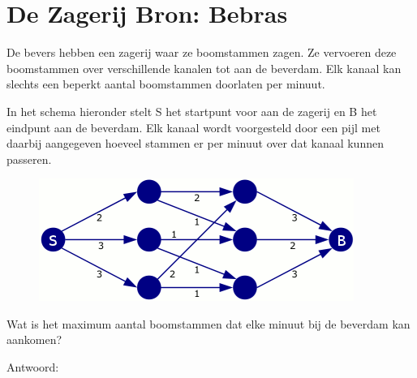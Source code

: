 \documentclass[12pt, a4paper]{article}
\begin{document}
	\begin{minipage}{\textwidth}
		\section{De Zagerij \hfill\small Bron: Bebras}
			De bevers hebben een zagerij waar ze boomstammen zagen. Ze vervoeren deze boomstammen over verschillende kanalen tot aan de beverdam. Elk kanaal kan slechts een beperkt aantal boomstammen doorlaten per minuut.
			
			In het schema hieronder stelt S het startpunt voor aan de zagerij en B het eindpunt aan de beverdam. Elk kanaal wordt voorgesteld door een pijl met daarbij aangegeven hoeveel stammen er per minuut over dat kanaal kunnen passeren.
			
			\begin{figure}[H]
				\centering
				\includegraphics[width=0.8\linewidth]{image1} 
			\end{figure}

			Wat is het maximum aantal boomstammen dat elke minuut bij de beverdam kan aankomen?

			\begin{center}
				Antwoord: \raisebox{-0.2cm}{\rule{5cm}{0.4pt}}
			\end{center}

	\end{minipage} \\ \\
	
\end{document}
